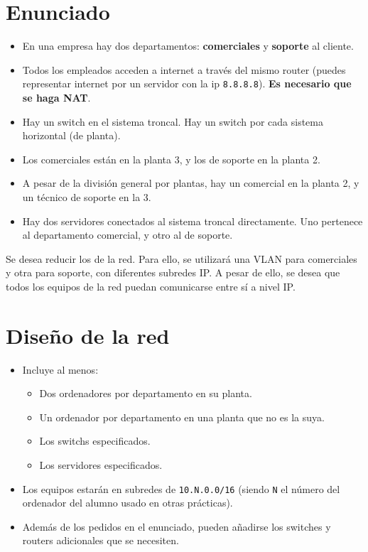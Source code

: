 \section{Enunciado}
\begin{itemize}
\item En una empresa hay dos departamentos: \textbf{comerciales} y \textbf{soporte} al cliente.
\item Todos los empleados acceden a internet a través del mismo router (puedes representar internet por un servidor con la ip \texttt{8.8.8.8}). \textbf{Es necesario que se haga NAT}.
\item Hay un switch en el sistema troncal. Hay un switch por cada sistema horizontal (de planta).
\item Los comerciales están en la planta 3, y los de soporte en la planta 2.
\item A pesar de la división general por plantas, hay un comercial en la planta 2, y un técnico de soporte en la 3.
\item Hay dos servidores conectados al sistema troncal directamente. Uno pertenece al departamento comercial, y otro al de soporte.
\end{itemize}
Se desea reducir los  de la red. Para ello, se utilizará una VLAN para comerciales y otra para soporte, con diferentes subredes IP.
A pesar de ello, se desea que todos los equipos de la red puedan comunicarse entre sí a nivel IP.
\section{Diseño de la red}
\begin{itemize}
\item Incluye al menos:
  \begin{itemize}
  \item Dos ordenadores por departamento en su planta.
  \item Un ordenador por departamento en una planta que no es la suya.
  \item Los switchs especificados.
  \item Los servidores especificados.
  \end{itemize}
\item Los equipos estarán en subredes de \texttt{10.N.0.0/16} (siendo \texttt{N} el número del ordenador del alumno usado en otras prácticas).
\item Además de los pedidos en el enunciado, pueden añadirse los switches y routers adicionales que se necesiten.  
\end{itemize}

